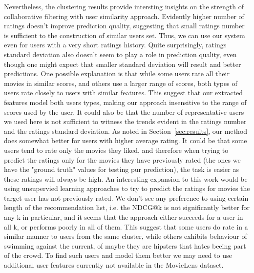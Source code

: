 Nevertheless, the clustering results provide intersting insights on the strength of collaborative filtering with user similarity approach. Evidently higher number of ratings doesn't improve prediction quality, suggesting that small ratings number is sufficient to the construction of similar users set. Thus, we can use our system even for users with a very short ratings history. Quite surprisingly, ratings standard deviation also doesn't seem to play a role in prediction quality, even though one might expect that smaller standard deviation will result and better predictions. One possible explanation is that while some users rate all their movies in similar scores, and others use a larger range of scores, both types of users rate closely to users with similar features. This suggest that our extracted features model both users types, making our approach insensitive to the range of scores used by the user. It could also be that the number of representative users we used here is not sufficient to witness the trends evident in the ratings number and the ratings standard deviation.
As noted in Section~\ref{sec:results}, our method does somewhat better for users with higher average rating. It could be that some users tend to rate only the movies they liked, and therefore when trying to predict the ratings only for the movies they have previously rated (the ones we have the "ground truth" values for testing pur prediction), the task is easier as these ratings will always be high. An interesting expansion to this work would be using unsupervied learning approaches to try to predict the ratings for movies the target user has not previously rated. We don't see any preference to using certain length of the recommendation list, i.e. the NDCG@k is not significantly better for any k in particular, and it seems that the approach either succeeds for a user in all k, or performs poorly in all of them. This suggest that some users do rate in a similar manner to users from the same cluster, while others exhibits behaviour of swimming against the current, of maybe they are hipsters that hates beeing part of the crowd. To find such users and model them better we may need to use additional user features currently not available in the MovieLens dataset.

